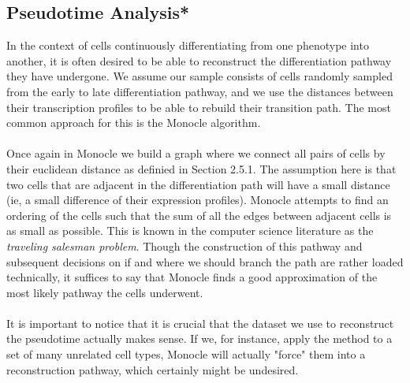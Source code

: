 \newpage
\subsection{Pseudotime Analysis*}
In the context of cells continuously differentiating from one phenotype into another, it is often desired to be able to reconstruct the differentiation pathway they have undergone. We assume our sample consists of cells randomly sampled from the early to late differentiation pathway, and we use the distances between their transcription profiles to be able to rebuild their transition path. The most common approach for this is the Monocle \cite{} algorithm. \\
\\
Once again in Monocle we build a graph where we connect all pairs of cells by their euclidean distance as definied in Section 2.5.1. The assumption here is that two cells that are adjacent in the differentiation path will have a small distance (ie, a small difference of their expression profiles). Monocle attempts to find an ordering of the cells such that the sum of all the edges between adjacent cells is as small as possible. This is known in the computer science literature as the \emph{traveling salesman problem}. Though the construction of this pathway and subsequent decisions on if and where we should branch the path are rather loaded technically, it suffices to say that Monocle finds a good approximation of the most likely pathway the cells underwent.\\
\\
It is important to notice that it is crucial that the dataset we use to reconstruct the pseudotime actually makes sense. If we, for instance, apply the method to a set of many unrelated cell types, Monocle will actually "force" them into a reconstruction pathway, which certainly might be undesired. 
 
\newpage




